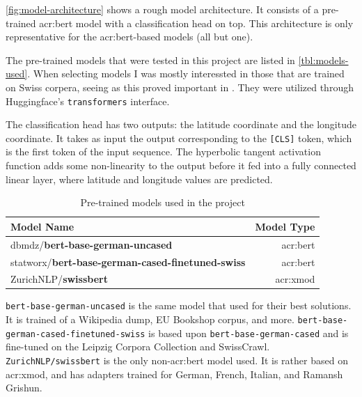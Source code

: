\autoref{fig:model-architecture} shows a rough model architecture. It consists of a pre-trained \acrshort{acr:bert} model with a classification head on top. This architecture is only representative for the \acrshort{acr:bert}-based models (all but one).

The pre-trained models that were tested in this project are listed in \autoref{tbl:models-used}. When selecting models I was mostly interessted in those that are trained on Swiss corpera, seeing as this proved important in \cite{scherrerHeLjuVarDial20202020}. They were utilized through Huggingface's \texttt{transformers} interface.

The classification head has two outputs: the latitude coordinate and the longitude coordinate. It takes as input the output corresponding to the \texttt{[CLS]} token, which is the first token of the input sequence. The hyperbolic tangent activation function adds some non-linearity to the output before it fed into a fully connected linear layer, where latitude and longitude values are predicted.



\begin{table}
    \centering
    \begin{tabular}{l|r}
        \toprule
        Model Name                                               & Model Type          \\
        \midrule
        dbmdz/\textbf{bert-base-german-uncased}                  & \acrshort{acr:bert} \\
        statworx/\textbf{bert-base-german-cased-finetuned-swiss} & \acrshort{acr:bert} \\
        ZurichNLP/\textbf{swissbert}                             & \acrshort{acr:xmod} \\
        \bottomrule
    \end{tabular}
    \caption{Pre-trained models used in the project}
    \label{tbl:models-used}
\end{table}

\texttt{bert-base-german-uncased} \citep{DbmdzBertbasegermanuncasedHugging} is the same model that \cite{scherrerHeLjuVarDial20202020} used for their best solutions. It is trained of a Wikipedia dump, EU Bookshop corpus, and more. \texttt{bert-base-german-cased-finetuned-swiss} is based upon \texttt{bert-base-german-cased} and is fine-tuned on the Leipzig Corpora Collection and SwissCrawl. \texttt{ZurichNLP/swissbert} is the only non-\acrshort{acr:bert} model used. It is rather based on \acrshort{acr:xmod}, and has adapters trained for German, French, Italian, and Ramansh Grishun.

